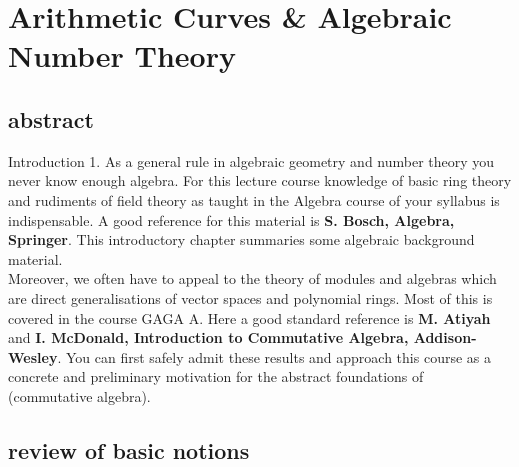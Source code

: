 \documentclass[12pt,a4paper,footinclude=true,headinclude=true]{scrbook} %
\begin{document}
	
	\tableofcontents 


\cleardoublepage\part{Arithmetic Curves \& Algebraic Number Theory}

\chapter*{abstract}    
\begin{paragraph}{Introduction 1.}
    As a general rule in algebraic geometry and number theory you never know enough algebra. For this lecture course knowledge of basic ring theory and rudiments of field theory as taught in the Algebra course of your syllabus is indispensable. A good reference for this material is \textbf{S. Bosch, Algebra, Springer}. This introductory chapter summaries some algebraic background material.\\
    Moreover, we often have to appeal to the theory of modules and algebras which are direct generalisations of vector spaces and polynomial rings. Most of this is covered in the course GAGA A. Here a good standard reference is \textbf{M. Atiyah} and \textbf{I. McDonald, Introduction to Commutative Algebra, Addison-Wesley}. You can first safely admit these results and approach this course as a concrete and preliminary motivation for the abstract foundations of (commutative algebra).
\end{paragraph}    
\setcounter{chapter}{-1}     

\chapter{review of basic notions}
\end{document}
